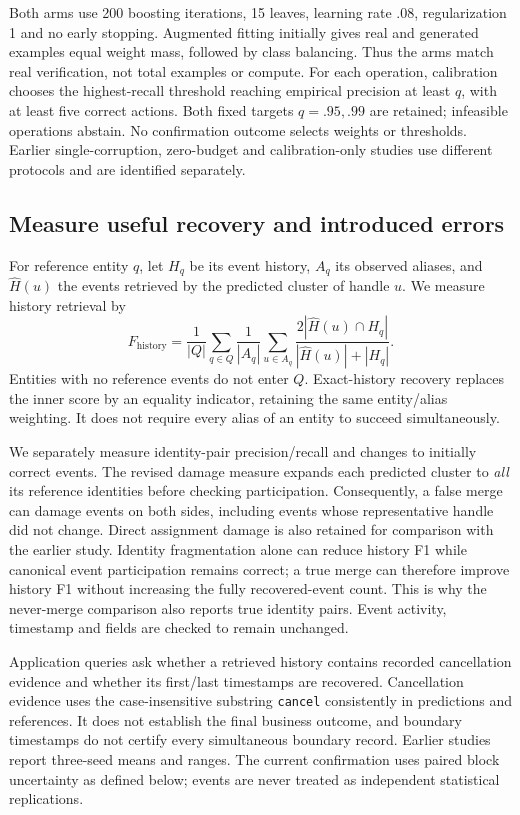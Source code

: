 \documentclass[11pt]{article}
\begin{document}
Both arms use 200 boosting iterations, 15 leaves, learning rate .08, regularization 1 and no early stopping. Augmented fitting initially gives real and generated examples equal weight mass, followed by class balancing. Thus the arms match real verification, not total examples or compute. For each operation, calibration chooses the highest-recall threshold reaching empirical precision at least $q$, with at least five correct actions. Both fixed targets $q=.95,.99$ are retained; infeasible operations abstain. No confirmation outcome selects weights or thresholds. Earlier single-corruption, zero-budget and calibration-only studies use different protocols and are identified separately.

\subsection{Measure useful recovery and introduced errors}
For reference entity $q$, let $H_q$ be its event history, $A_q$ its observed aliases, and $\widehat H(u)$ the events retrieved by the predicted cluster of handle $u$. We measure history retrieval by
\[
 F_{\mathrm{history}}=\frac{1}{|Q|}\sum_{q\in Q}\frac{1}{|A_q|}
 \sum_{u\in A_q}\frac{2|\widehat H(u)\cap H_q|}{|\widehat H(u)|+|H_q|}.
\]
Entities with no reference events do not enter $Q$. Exact-history recovery replaces the inner score by an equality indicator, retaining the same entity/alias weighting. It does not require every alias of an entity to succeed simultaneously.

We separately measure identity-pair precision/recall and changes to initially correct events. The revised damage measure expands each predicted cluster to \emph{all} its reference identities before checking participation. Consequently, a false merge can damage events on both sides, including events whose representative handle did not change. Direct assignment damage is also retained for comparison with the earlier study. Identity fragmentation alone can reduce history F1 while canonical event participation remains correct; a true merge can therefore improve history F1 without increasing the fully recovered-event count. This is why the never-merge comparison also reports true identity pairs. Event activity, timestamp and fields are checked to remain unchanged.

Application queries ask whether a retrieved history contains recorded cancellation evidence and whether its first/last timestamps are recovered. Cancellation evidence uses the case-insensitive substring \texttt{cancel} consistently in predictions and references. It does not establish the final business outcome, and boundary timestamps do not certify every simultaneous boundary record. Earlier studies report three-seed means and ranges. The current confirmation uses paired block uncertainty as defined below; events are never treated as independent statistical replications.
\end{document}
